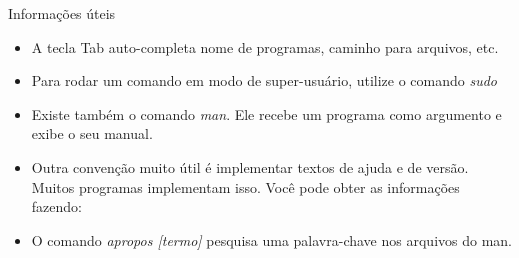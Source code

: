 \documentclass{beamer}
\begin{document}
\begin{frame}{Informações úteis}
  \begin{itemize}
    \item A tecla Tab auto-completa nome de programas, caminho para arquivos,
      etc.
  \item Para rodar um comando em modo de super-usuário, utilize o comando
    \emph{sudo}
  \item Existe também o comando \emph{man}. Ele recebe um programa como
    argumento e exibe o seu manual.
  \item Outra convenção muito útil é implementar textos de ajuda e de versão.
    Muitos programas implementam isso. Você pode obter as informações fazendo:
  \item O comando \emph{apropos [termo]} pesquisa uma palavra-chave nos arquivos
    do man.
  \end{itemize}
  \begin{center}
    \begin{shell}
      \\
      \\
      \\
    \end{shell}
  \end{center}
\end{frame}

\begin{frame}
  \begin{center}
    \begin{shell}
      \\
      \\
      \\
      \\
      \\
    \end{shell}
  \end{center}
\end{frame}
\end{document}
